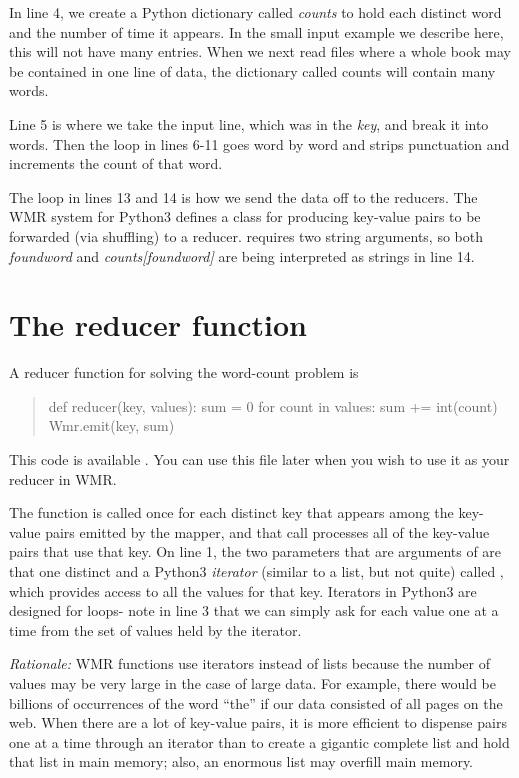 \documentclass[letterpaper,10pt,openany,oneside]{sphinxmanual}
\begin{document}
In line 4, we create a Python dictionary called \emph{counts} to hold
each distinct word and the number of time it appears. In the small
input example we describe here, this will not have many entries.
When we next read files where a whole book may be contained in one
line of data, the dictionary called counts will contain many
words.

Line 5 is where we take the input line, which was in the \emph{key}, and
break it into words. Then the loop in lines 6-11 goes word by word
and strips punctuation and increments the count of that word.

The loop in lines 13 and 14 is how we send the data off to the
reducers. The WMR system for Python3 defines a class  for producing key-value pairs to
be forwarded (via shuffling) to a reducer.  requires
two string arguments, so both \emph{foundword} and \emph{counts{[}foundword{]}}
are being interpreted as strings in line 14.


\section{The reducer function}
\label{wmr_py/wmr_py:the-reducer-function}
A reducer function for solving the word-count problem is
\begin{quote}

def reducer(key, values): sum = 0 for count in values: sum +=
int(count) Wmr.emit(key, sum)
\end{quote}

This code is available .
You can use this file later when you wish to use it as your reducer in WMR.

The function  is called once for each distinct key
that appears among the key-value pairs emitted by the mapper, and
that call processes all of the key-value pairs that use that key.
On line 1, the two parameters that are arguments of 
are that one distinct  and a Python3 \emph{iterator} (similar to a
list, but not quite) called , which provides access to
all the values for that key. Iterators in Python3 are designed for
 loops- note in line 3 that we can simply ask for each value
one at a time from the set of values held by the iterator.

\emph{Rationale:} WMR  functions use iterators instead of
lists because the number of values may be very large in the case of
large data. For example, there would be billions of occurrences of
the word ``the'' if our data consisted of all pages on the web. When
there are a lot of key-value pairs, it is more efficient to
dispense pairs one at a time through an iterator than to create a
gigantic complete list and hold that list in main memory; also, an
enormous list may overfill main memory.
\end{document}
